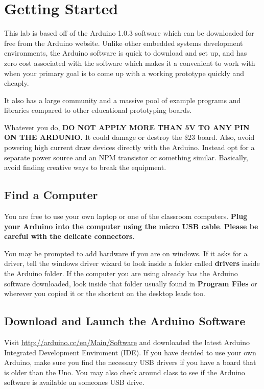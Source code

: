 \documentclass[11pt,a4paper]{article}
\begin{document}



\section{Getting Started} %
\label{sec:getting_started}

This lab is based off of the Arduino 1.0.3 software which can be downloaded for free from the Arduino website.\cite{arduino_dl}  Unlike other embedded systems development environments, the Arduino software is quick to download and set up, and has zero cost associated with the software which makes it a convenient to work with when your primary goal is to come up with a working prototype quickly and cheaply.

It also has a large community and a massive pool of example programs and libraries compared to other educational prototyping boards.

Whatever you do, \textbf{DO NOT APPLY MORE THAN 5V TO ANY PIN ON THE ARDUNIO.}  It could damage or destroy the \$23 board.  Also, avoid powering high current draw devices directly with the Arduino.  Instead opt for a separate power source and an NPM transistor or something similar.  Basically, avoid finding creative ways to break the equipment.

\subsection{Find a Computer} %
\label{sub:find_a_computer}
You are free to use your own laptop or one of the classroom computers.  \textbf{Plug your Arduino into the computer using the micro USB cable}.  \textbf{Please be careful with the delicate connectors}.  

You may be prompted to add hardware if you are on windows.  If it asks for a driver, tell the windows driver wizard to look inside a folder called \textbf{drivers} inside the Arduino folder.  If the computer you are using already has the Arduino software downloaded, look inside that folder usually found in \textbf{Program Files} or wherever you copied it or the shortcut on the desktop leads too.


\subsection{Download and Launch the Arduino Software} %
\label{sub:download_and_launch_the_arduino_software}
Visit \url{http://arduino.cc/en/Main/Software} and downloaded the latest Arduino Integrated Development Enviroment (IDE)\cite{arduino_dl}.  If you have decided to use your own Arduino, make sure you find the necessary USB drivers if you have a board that is older than the Uno.  You may also check around class to see if the Arduino software is available on someones USB drive.
\end{document}
